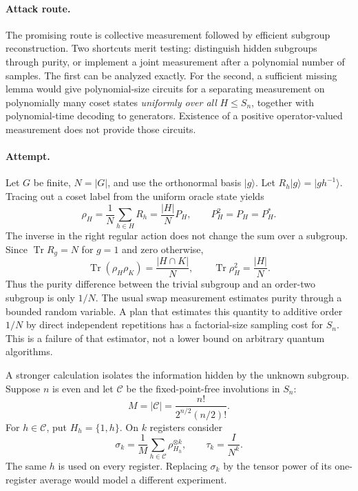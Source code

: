 \documentclass[11pt,a4paper]{article}
\numberwithin{equation}{section}
\begin{document}
\paragraph{Attack route.}
The promising route is collective measurement followed by efficient subgroup reconstruction. Two shortcuts merit testing: distinguish hidden subgroups through purity, or implement a joint measurement after a polynomial number of samples. The first can be analyzed exactly. For the second, a sufficient missing lemma would give polynomial-size circuits for a separating measurement on polynomially many coset states \emph{uniformly over all} $H\le S_n$, together with polynomial-time decoding to generators. Existence of a positive operator-valued measurement does not provide those circuits.

\paragraph{Attempt.}
Let $G$ be finite, $N=|G|$, and use the orthonormal basis $|g\rangle$. Let $R_h|g\rangle=|gh^{-1}\rangle$. Tracing out a coset label from the uniform oracle state yields
\begin{equation}\label{eq185:rho}
 \rho_H=\frac1N\sum_{h\in H}R_h=\frac{|H|}{N}P_H,
 \qquad P_H^2=P_H=P_H^*.
\end{equation}
The inverse in the right regular action does not change the sum over a subgroup. Since $\operatorname{Tr}R_g=N$ for $g=1$ and zero otherwise,
\begin{equation}\label{eq185:overlap}
 \operatorname{Tr}(\rho_H\rho_K)=\frac{|H\cap K|}{N},
 \qquad \operatorname{Tr}\rho_H^2=\frac{|H|}{N}.
\end{equation}
Thus the purity difference between the trivial subgroup and an order-two subgroup is only $1/N$. The usual swap measurement estimates purity through a bounded random variable. A plan that estimates this quantity to additive order $1/N$ by direct independent repetitions has a factorial-size sampling cost for $S_n$. This is a failure of that estimator, not a lower bound on arbitrary quantum algorithms.

A stronger calculation isolates the information hidden by the unknown subgroup. Suppose $n$ is even and let $\mathcal C$ be the fixed-point-free involutions in $S_n$:
\[
 M=|\mathcal C|=\frac{n!}{2^{n/2}(n/2)!}.
\]
For $h\in\mathcal C$, put $H_h=\{1,h\}$. On $k$ registers consider
\[
 \sigma_k=\frac1M\sum_{h\in\mathcal C}\rho_{H_h}^{\otimes k},
 \qquad \tau_k=\frac{I}{N^k}.
\]
The same $h$ is used on every register. Replacing $\sigma_k$ by the tensor power of its one-register average would model a different experiment.
\end{document}
